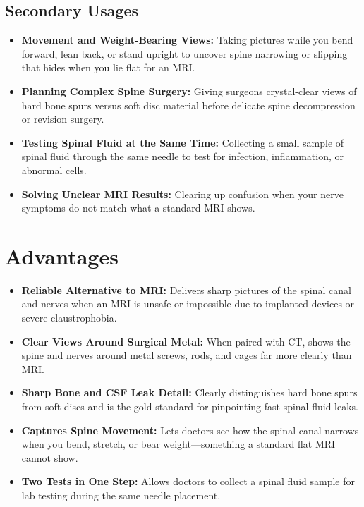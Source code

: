\subsection{Secondary Usages}
\begin{itemize}
    \item \textbf{Movement and Weight-Bearing Views:} Taking pictures while you bend forward, lean back, or stand upright to uncover spine narrowing or slipping that hides when you lie flat for an MRI.
    \item \textbf{Planning Complex Spine Surgery:} Giving surgeons crystal-clear views of hard bone spurs versus soft disc material before delicate spine decompression or revision surgery.
    \item \textbf{Testing Spinal Fluid at the Same Time:} Collecting a small sample of spinal fluid through the same needle to test for infection, inflammation, or abnormal cells.
    \item \textbf{Solving Unclear MRI Results:} Clearing up confusion when your nerve symptoms do not match what a standard MRI shows.
\end{itemize}

\section{Advantages}
\begin{itemize}
    \item \textbf{Reliable Alternative to MRI:} Delivers sharp pictures of the spinal canal and nerves when an MRI is unsafe or impossible due to implanted devices or severe claustrophobia.
    \item \textbf{Clear Views Around Surgical Metal:} When paired with CT, shows the spine and nerves around metal screws, rods, and cages far more clearly than MRI.
    \item \textbf{Sharp Bone and CSF Leak Detail:} Clearly distinguishes hard bone spurs from soft discs and is the gold standard for pinpointing fast spinal fluid leaks.
    \item \textbf{Captures Spine Movement:} Lets doctors see how the spinal canal narrows when you bend, stretch, or bear weight---something a standard flat MRI cannot show.
    \item \textbf{Two Tests in One Step:} Allows doctors to collect a spinal fluid sample for lab testing during the same needle placement.
\end{itemize}

